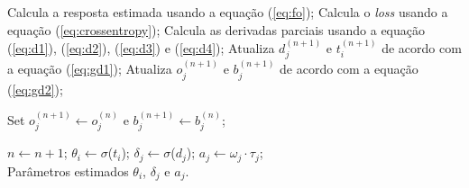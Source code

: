 \begin{algorithm}[!htp]
\begin{algorithmic}[1]
    \State Calcula a resposta estimada usando a equação (\ref{eq:fo});
    \State Calcula o \textit{loss} usando a equação (\ref{eq:crossentropy});
    \State Calcula as derivadas parciais usando a equação (\ref{eq:d1}), (\ref{eq:d2}), (\ref{eq:d3}) e (\ref{eq:d4}); 
    \State Atualiza $d_j^{(n+1)}$ e $t_i^{(n+1)}$ de acordo com a equação (\ref{eq:gd1});
    \State Atualiza $o_j^{(n+1)}$ e $b_j^{(n+1)}$ de acordo com a equação (\ref{eq:gd2});
    
    \Else
        \State Set $o_j^{(n+1)}\leftarrow o_j^{(n)}$ e $b_j^{(n+1)}\leftarrow b_j^{(n)}$;
    \EndIf

    \State $n \leftarrow n + 1$;
\EndFor
\State $\theta_i \leftarrow \sigma$($t_i$);
\State $\delta_j \leftarrow \sigma$($d_j$);
\State $a_j \leftarrow \omega_j \cdot \tau_j$;\\
\Return Parâmetros estimados $\theta_i$, $\delta_j$ e $a_j$.
\end{algorithmic}
\end{algorithm}

